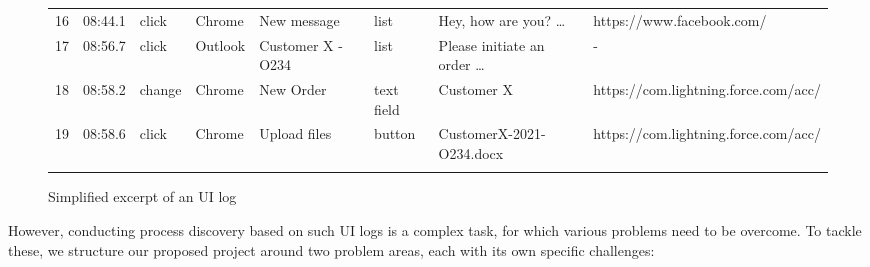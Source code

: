 \begin{figure}[h!]
\begin{adjustbox}{max width=\textwidth}
\begin{tabular}{llllllll}
16&08:44.1&click&Chrome&New message&list&Hey, how are you? …&https://www.facebook.com/\\\noalign{\smallskip}
17&08:56.7&click&Outlook&Customer X - O234&list&Please initiate an order …&-\\\noalign{\smallskip}
18&08:58.2&change&Chrome&New Order&text field&Customer X&https://com.lightning.force.com/acc/\\\noalign{\smallskip}
19&08:58.6&click&Chrome&Upload files&button&CustomerX-2021-O234.docx&https://com.lightning.force.com/acc/\\\noalign{\smallskip}
\hline\noalign{\smallskip}
\end{tabular}
\end{adjustbox}
\caption{Simplified excerpt of an UI log}
\label{fig:example}
\end{figure}

However, conducting process discovery based on such UI logs is a complex task, for which various problems need to be overcome. To tackle these, we structure our proposed project around two problem areas, each with its own specific challenges:


